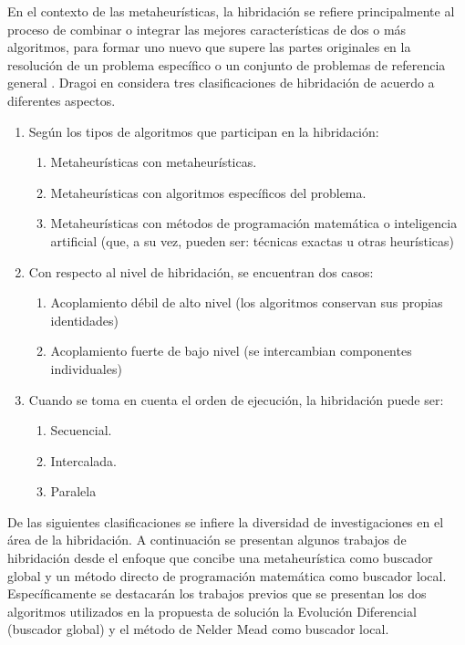 En el contexto de las metaheurísticas, la hibridación se refiere principalmente al proceso de combinar o integrar las mejores características de dos o más algoritmos, para formar uno nuevo que supere las partes originales en la resolución de un problema específico o un conjunto de problemas de referencia general \cite{Swagatam_2011}. Dragoi en \cite{Dragoi_2015} considera tres clasificaciones de hibridación de acuerdo a diferentes aspectos.
\begin{enumerate}
\item  Según los tipos de algoritmos que participan en la hibridación:
\begin{enumerate}
\item Metaheurísticas con metaheurísticas.
\item Metaheurísticas con algoritmos específicos del problema.
\item Metaheurísticas con métodos de programación matemática o inteligencia artificial (que, a su vez, pueden ser: técnicas exactas u otras heurísticas)
\end{enumerate}

\item Con respecto al nivel de hibridación, se encuentran dos casos:
\begin{enumerate}
\item Acoplamiento débil de alto nivel (los algoritmos conservan sus propias identidades)
\item Acoplamiento fuerte de bajo nivel (se intercambian componentes individuales)
\end{enumerate}

\item Cuando se toma en cuenta el orden de ejecución, la hibridación puede ser: 
\begin{enumerate}
\item  Secuencial.
\item  Intercalada.
\item  Paralela
\end{enumerate}
\end{enumerate}
De las siguientes clasificaciones se infiere la diversidad de investigaciones en el área de la hibridación. A continuación se presentan algunos trabajos de hibridación desde el enfoque que concibe una metaheurística como buscador global y un método directo de programación matemática como buscador local. Específicamente se destacarán los trabajos previos que se presentan los dos algoritmos utilizados en la propuesta de solución la Evolución Diferencial (buscador global) y el método de Nelder Mead como buscador local.

